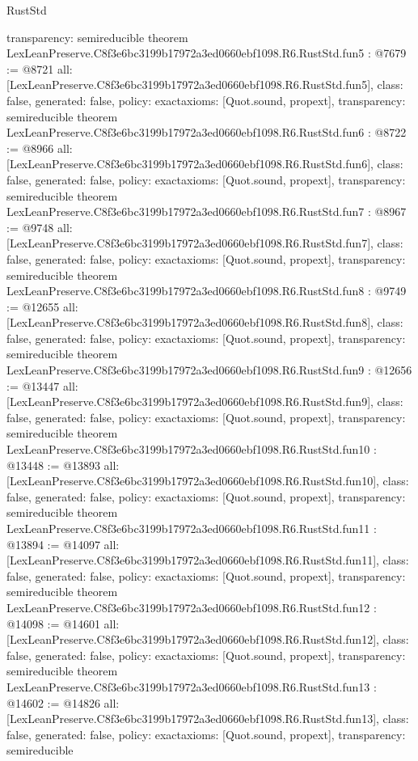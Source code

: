 \begin{lexlean}{RustStd}
\begin{coremodule}
{  transparency: semireducible
}
theorem LexLeanPreserve.C8f3e6bc3199b17972a3ed0660ebf1098.R6.RustStd.fun5 : @7679 := @8721 {
  all: [LexLeanPreserve.C8f3e6bc3199b17972a3ed0660ebf1098.R6.RustStd.fun5],
  class: false,
  generated: false,
  policy: exact{axioms: [Quot.sound, propext]},
  transparency: semireducible
}
theorem LexLeanPreserve.C8f3e6bc3199b17972a3ed0660ebf1098.R6.RustStd.fun6 : @8722 := @8966 {
  all: [LexLeanPreserve.C8f3e6bc3199b17972a3ed0660ebf1098.R6.RustStd.fun6],
  class: false,
  generated: false,
  policy: exact{axioms: [Quot.sound, propext]},
  transparency: semireducible
}
theorem LexLeanPreserve.C8f3e6bc3199b17972a3ed0660ebf1098.R6.RustStd.fun7 : @8967 := @9748 {
  all: [LexLeanPreserve.C8f3e6bc3199b17972a3ed0660ebf1098.R6.RustStd.fun7],
  class: false,
  generated: false,
  policy: exact{axioms: [Quot.sound, propext]},
  transparency: semireducible
}
theorem LexLeanPreserve.C8f3e6bc3199b17972a3ed0660ebf1098.R6.RustStd.fun8 : @9749 := @12655 {
  all: [LexLeanPreserve.C8f3e6bc3199b17972a3ed0660ebf1098.R6.RustStd.fun8],
  class: false,
  generated: false,
  policy: exact{axioms: [Quot.sound, propext]},
  transparency: semireducible
}
theorem LexLeanPreserve.C8f3e6bc3199b17972a3ed0660ebf1098.R6.RustStd.fun9 : @12656 := @13447 {
  all: [LexLeanPreserve.C8f3e6bc3199b17972a3ed0660ebf1098.R6.RustStd.fun9],
  class: false,
  generated: false,
  policy: exact{axioms: [Quot.sound, propext]},
  transparency: semireducible
}
theorem LexLeanPreserve.C8f3e6bc3199b17972a3ed0660ebf1098.R6.RustStd.fun10 : @13448 := @13893 {
  all: [LexLeanPreserve.C8f3e6bc3199b17972a3ed0660ebf1098.R6.RustStd.fun10],
  class: false,
  generated: false,
  policy: exact{axioms: [Quot.sound, propext]},
  transparency: semireducible
}
theorem LexLeanPreserve.C8f3e6bc3199b17972a3ed0660ebf1098.R6.RustStd.fun11 : @13894 := @14097 {
  all: [LexLeanPreserve.C8f3e6bc3199b17972a3ed0660ebf1098.R6.RustStd.fun11],
  class: false,
  generated: false,
  policy: exact{axioms: [Quot.sound, propext]},
  transparency: semireducible
}
theorem LexLeanPreserve.C8f3e6bc3199b17972a3ed0660ebf1098.R6.RustStd.fun12 : @14098 := @14601 {
  all: [LexLeanPreserve.C8f3e6bc3199b17972a3ed0660ebf1098.R6.RustStd.fun12],
  class: false,
  generated: false,
  policy: exact{axioms: [Quot.sound, propext]},
  transparency: semireducible
}
theorem LexLeanPreserve.C8f3e6bc3199b17972a3ed0660ebf1098.R6.RustStd.fun13 : @14602 := @14826 {
  all: [LexLeanPreserve.C8f3e6bc3199b17972a3ed0660ebf1098.R6.RustStd.fun13],
  class: false,
  generated: false,
  policy: exact{axioms: [Quot.sound, propext]},
  transparency: semireducible
}
\end{coremodule}
\end{lexlean}
